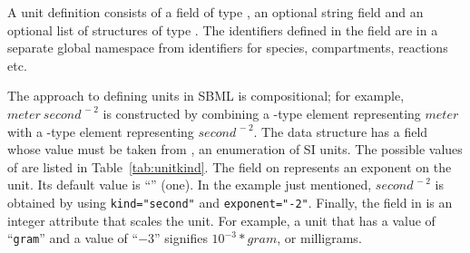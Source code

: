 \documentclass[10pt,twocolumntoc]{cekarticle}
\newcommand{\vref}[1]{\ref{#1}}
\begin{document}
A unit definition consists of a  field of type
, an optional string field  and an
optional list of structures of type . The identifiers
defined in the  field are in a separate global
namespace from identifiers for species, compartments, reactions
etc.

The approach to defining units in SBML is compositional; for
example, $meter\ second^{\,-2}$ is constructed by combining a
-type element representing $meter$ with a
-type element representing $second^{\,-2}$.  The
 data structure has a  field whose value
must be taken from , an enumeration of SI units.
The possible values of  are listed in
Table~\vref{tab:unitkind}.  The  field on
 represents an exponent on the unit.  Its default
value is ``'' (one).  In the example just
mentioned, $second^{\,-2}$ is obtained by using
\texttt{kind="second"} and \texttt{exponent="-2"}. Finally, the
 field in  is an integer attribute that
scales the unit.  For example, a unit that has a 
value of ``\texttt{gram}'' and a  value of
``\texttt{$-3$}'' signifies $10^{-3} * gram$, or milligrams.
\end{document}
